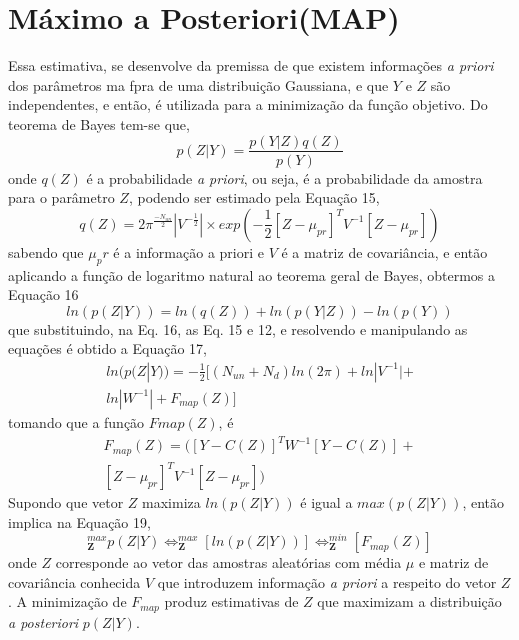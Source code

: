 \documentclass[por]{Template_SBEF}
\begin{document}
\section{Máximo a Posteriori(MAP)}
Essa estimativa, se desenvolve da premissa de que existem informações \textit{a priori} dos parâmetros ma fpra de uma distribuição Gaussiana, e que $Y$ e $Z$ são independentes, e então, é utilizada para a minimização da função objetivo. Do teorema de Bayes tem-se que,
\begin{equation}
p(Z|Y)= \frac{p(Y|Z)q(Z)}{p(Y)}
\end{equation}
onde $q(Z)$ é a probabilidade \textit{a priori}, ou seja, é a probabilidade da amostra para o parâmetro $Z$, podendo ser estimado pela Equação 15,
\begin{equation}
q(Z)=2\pi^{\frac{-N_{un}}{2}}|V^{-\frac{1}{2}}| \times exp(-\frac{1}{2}[Z-\mu_{pr}]^T V^{-1}[Z-\mu_{pr}])
\end{equation} 
sabendo que $\mu_pr$ é a informação a priori e $V$ é a matriz de covariância, e então aplicando a função de logaritmo natural ao teorema geral de Bayes, obtermos a Equação 16
\begin{equation}
ln(p(Z|Y))=ln(q(Z))+ln(p(Y|Z))-ln(p(Y))
\end{equation}
que substituindo, na Eq. 16, as Eq. 15 e 12, e resolvendo e manipulando as equações é obtido a Equação 17,
\begin{equation}
\begin{split}
ln(p(Z|Y)) = -\frac{1}{2}[(N_{un}+N_d)ln(2\pi)+ln|V^{-1}|+\\
ln|W^{-1}|+F_{map}(Z)]
\end{split}
\end{equation} 
tomando que a função $F{map}(Z)$, é
\vspace{10pt}
\begin{equation}
\begin{split}
F_{map}(Z)=([Y-C(Z)]^TW^{-1}[Y-C(Z)]+\\
[Z- \mu_{pr}]^T V^{-1}[Z-\mu_{pr}])
\end{split}
\end{equation}
Supondo que vetor $Z$ maximiza $ln(p(Z|Y))$ é igual a $max(p(Z|Y))$, então implica na Equação 19,
\begin{equation}
_\mathbf{Z}^{max} p(Z|Y) \Leftrightarrow _\mathbf{Z}^{max} [ln(p(Z|Y))] \Leftrightarrow _\mathbf{Z}^{min} [F_{map}(Z)]
\end{equation}
onde $Z$ corresponde ao vetor das amostras aleatórias com média $\mu$ e matriz de covariância conhecida $V$ que introduzem informação \textit{a priori} a respeito do vetor $Z$. A minimização de $F_{map}$ produz estimativas de $Z$ que maximizam a distribuição \textit{a posteriori} $p(Z|Y)$.
\end{document}

